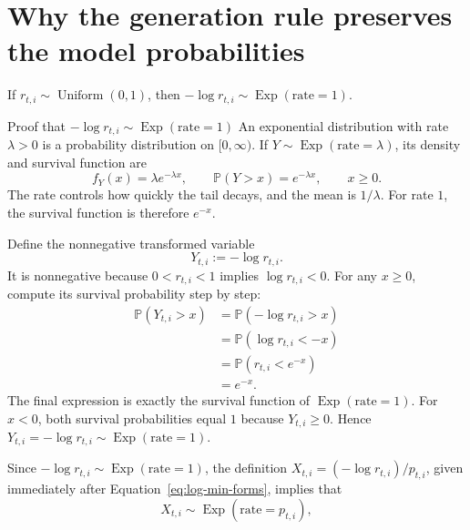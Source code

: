 \documentclass[11pt]{article}
\DeclareRobustCommand{\iperpaper}[2]{%
  \begingroup
  \hypersetup{pdfborder=0 0 0}%
  \href{iperpaper:#1}{{\color{iperpaperlink}#2}}%
  \endgroup
}
\def\iperpaper#1#2{#2}%
\newcommand{\U}{\operatorname{Uniform}}
\newcommand{\Exp}{\operatorname{Exp}}
\newcommand{\Pp}{\mathbb{P}}
\begin{document}
\section{Why the generation rule preserves the model probabilities}

If $r_{t,i}\sim\iperpaper{uniform_symbol}{\U}(0,1)$, then
$\iperpaper{unit_exponential_transform}{-\log r_{t,i}\sim\Exp(\text{rate}=1)}$.

\begin{leveltwo}{Proof that \texorpdfstring{$-\log r_{t,i}\sim\Exp(\text{rate}=1)$}{-log r is unit exponential}}
An \iperpaper{exponential_distribution_concept}{exponential distribution} with rate
$\lambda>0$ is a probability distribution on $[0,\infty)$. If
$Y\sim\iperpaper{exp_symbol}{\Exp}(\text{rate}=\lambda)$, its density and survival function are
\[
  \iperpaper{exponential_distribution_survival}{
  f_Y(x)=\lambda e^{-\lambda x},
  \qquad
  \Pp(Y>x)=e^{-\lambda x},
  \qquad x\ge0.}
\]
The rate controls how quickly the tail decays, and the mean is $1/\lambda$.
For rate $1$, the survival function is therefore $e^{-x}$.

\begin{samepage}
Define the nonnegative transformed variable
\[
  \iperpaper{unit_exponential_variable}{Y_{t,i}:=-\log r_{t,i}}.
\]
It is nonnegative because $0<r_{t,i}<1$ implies $\log r_{t,i}<0$.
For any $x\ge0$, compute its survival probability step by step:
\begin{align*}
  \Pp(Y_{t,i}>x)
  &=\iperpaper{unit_exp_substitution}{\Pp(-\log r_{t,i}>x)}\\
  &=\iperpaper{unit_exp_sign_reversal}{\Pp(\log r_{t,i}<-x)}\\
  &=\iperpaper{unit_exp_monotone_exponential}{\Pp(r_{t,i}<e^{-x})}\\
  &=\iperpaper{unit_exp_uniform_cdf}{e^{-x}}.
\end{align*}
The final expression is exactly the survival function of
$\iperpaper{exp_symbol}{\Exp}(\text{rate}=1)$. For $x<0$, both survival probabilities equal $1$
because $Y_{t,i}\ge0$. Hence
$Y_{t,i}=-\log r_{t,i}\sim\iperpaper{exp_symbol}{\Exp}(\text{rate}=1)$.
\end{samepage}
\end{leveltwo}

Since $-\log r_{t,i}\sim\iperpaper{exp_symbol}{\Exp}(\text{rate}=1)$, the definition $X_{t,i}=(-\log r_{t,i})/p_{t,i}$, given immediately after Equation~\eqref{eq:log-min-forms}, implies that
\[
  \iperpaper{race_distribution}{X_{t,i}\sim\Exp(\text{rate}=p_{t,i})},
\]
\end{document}
